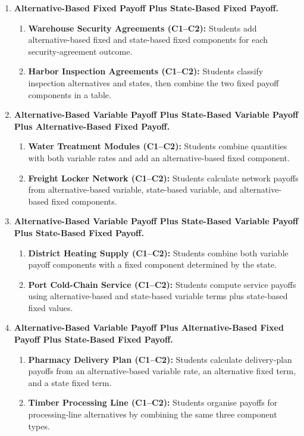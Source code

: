\begin{enumerate}
		\item \textbf{Alternative-Based Fixed Payoff Plus State-Based Fixed Payoff.}
		\begin{enumerate}
			\item \textbf{Warehouse Security Agreements (C1--C2):} Students add alternative-based fixed and state-based fixed components for each security-agreement outcome.
			\item \textbf{Harbor Inspection Agreements (C1--C2):} Students classify inspection alternatives and states, then combine the two fixed payoff components in a table.
		\end{enumerate}

		\item \textbf{Alternative-Based Variable Payoff Plus State-Based Variable Payoff Plus Alternative-Based Fixed Payoff.}
		\begin{enumerate}
			\item \textbf{Water Treatment Modules (C1--C2):} Students combine quantities with both variable rates and add an alternative-based fixed component.
			\item \textbf{Freight Locker Network (C1--C2):} Students calculate network payoffs from alternative-based variable, state-based variable, and alternative-based fixed components.
		\end{enumerate}

		\item \textbf{Alternative-Based Variable Payoff Plus State-Based Variable Payoff Plus State-Based Fixed Payoff.}
		\begin{enumerate}
			\item \textbf{District Heating Supply (C1--C2):} Students combine both variable payoff components with a fixed component determined by the state.
			\item \textbf{Port Cold-Chain Service (C1--C2):} Students compute service payoffs using alternative-based and state-based variable terms plus state-based fixed values.
		\end{enumerate}

		\item \textbf{Alternative-Based Variable Payoff Plus Alternative-Based Fixed Payoff Plus State-Based Fixed Payoff.}
		\begin{enumerate}
			\item \textbf{Pharmacy Delivery Plan (C1--C2):} Students calculate delivery-plan payoffs from an alternative-based variable rate, an alternative fixed term, and a state fixed term.
			\item \textbf{Timber Processing Line (C1--C2):} Students organise payoffs for processing-line alternatives by combining the same three component types.
		\end{enumerate}


\end{enumerate}
